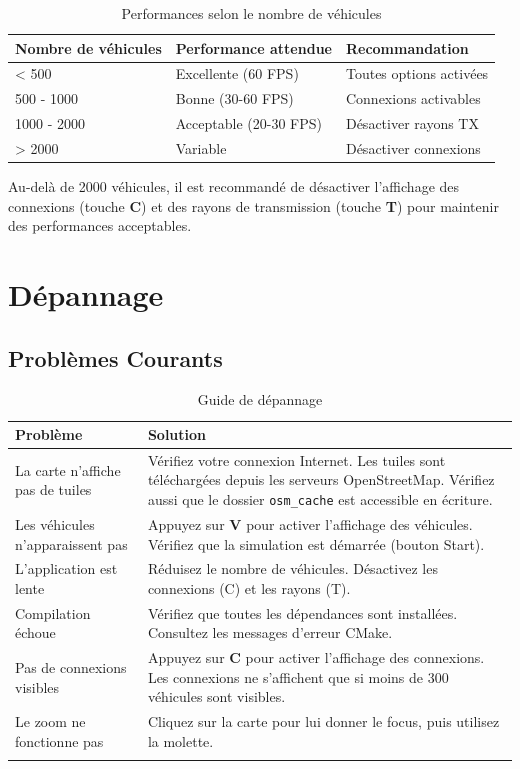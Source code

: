 \documentclass[12pt,a4paper]{article}
\begin{document}
\begin{table}[H]
\centering
\begin{tabular}{lll}
\toprule
\textbf{Nombre de véhicules} & \textbf{Performance attendue} & \textbf{Recommandation} \\
\midrule
< 500 & Excellente (60 FPS) & Toutes options activées \\
500 - 1000 & Bonne (30-60 FPS) & Connexions activables \\
1000 - 2000 & Acceptable (20-30 FPS) & Désactiver rayons TX \\
> 2000 & Variable & Désactiver connexions \\
\bottomrule
\end{tabular}
\caption{Performances selon le nombre de véhicules}
\end{table}

\begin{warningbox}
Au-delà de 2000 véhicules, il est recommandé de désactiver l'affichage des connexions (touche \textbf{C}) et des rayons de transmission (touche \textbf{T}) pour maintenir des performances acceptables.
\end{warningbox}

\section{Dépannage}

\subsection{Problèmes Courants}

\begin{longtable}{p{5cm}p{9cm}}
\toprule
\textbf{Problème} & \textbf{Solution} \\
\midrule
\endhead
La carte n'affiche pas de tuiles & Vérifiez votre connexion Internet. Les tuiles sont téléchargées depuis les serveurs OpenStreetMap. Vérifiez aussi que le dossier \texttt{osm\_cache} est accessible en écriture. \\
\midrule
Les véhicules n'apparaissent pas & Appuyez sur \textbf{V} pour activer l'affichage des véhicules. Vérifiez que la simulation est démarrée (bouton Start). \\
\midrule
L'application est lente & Réduisez le nombre de véhicules. Désactivez les connexions (C) et les rayons (T). \\
\midrule
Compilation échoue & Vérifiez que toutes les dépendances sont installées. Consultez les messages d'erreur CMake. \\
\midrule
Pas de connexions visibles & Appuyez sur \textbf{C} pour activer l'affichage des connexions. Les connexions ne s'affichent que si moins de 300 véhicules sont visibles. \\
\midrule
Le zoom ne fonctionne pas & Cliquez sur la carte pour lui donner le focus, puis utilisez la molette. \\
\bottomrule
\caption{Guide de dépannage}
\end{longtable}
\end{document}
